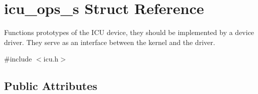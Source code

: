 \hypertarget{structicu__ops__s}{\section{icu\-\_\-ops\-\_\-s Struct Reference}
\label{structicu__ops__s}
}


Functions prototypes of the I\-C\-U device, they should be implemented by a device driver. They serve as an interface between the kernel and the driver.  




{\ttfamily \#include $<$icu.\-h$>$}

\subsection*{Public Attributes}
